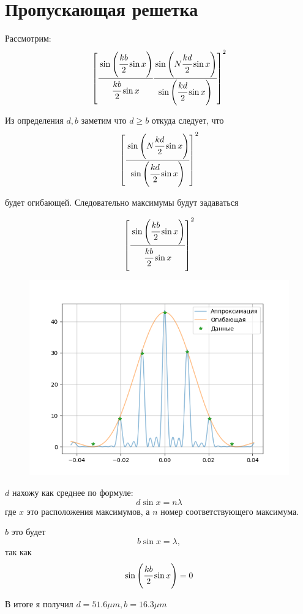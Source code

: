 \section{Пропускающая решетка}
Рассмотрим:
\begin{equation}
    \left[ \cfrac{\sin\left( \cfrac{kb}{2}\sin{x} \right)}{\cfrac{kb}{2}\sin{x}}
    \cfrac{\sin\left( N\cfrac{kd}{2}\sin{x} \right)}{\sin\left( \cfrac{kd}{2}\sin{x} \right)} \right]^2
\end{equation}

Из определения $d, b$ заметим что $d \geq b$ откуда следует, что
\begin{equation}
    \left[ \cfrac{\sin\left( N\cfrac{kd}{2}\sin{x} \right)}{\sin\left( \cfrac{kd}{2}\sin{x} \right)} \right]^2
\end{equation}

будет огибающей. Следовательно максимумы будут задаваться 

\begin{equation}
    \left[ \cfrac{\sin\left( \cfrac{kb}{2}\sin{x} \right)}{\cfrac{kb}{2}\sin{x}} \right]^2
\end{equation}

\begin{figure}[h]
    \centering
    \includegraphics[trim={0 0 0 0},clip,width=\textwidth]{Ex_2/ex_2_1.png}
    \caption{}
    \label{Ex_2_1}
\end{figure}

$d$ нахожу как среднее по формуле:
\begin{equation}
    d\sin{x} = n\lambda
\end{equation}
где $x$ это расположения максимумов, а $n$ номер соответствующего максимума.

$b$ это будет 
\begin{equation}
    b\sin{x} = \lambda,
\end{equation}
так как 
\begin{equation}
    \sin\left( \cfrac{kb}{2}\sin{x} \right) = 0
\end{equation}

В итоге я получил $d = 51.6 \mu m, b = 16.3 \mu m$
